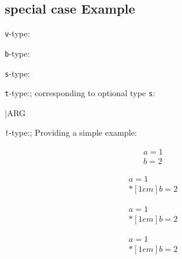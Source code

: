 \documentclass{article}
\begin{document}
\def\TypeT#1{\textbullet\; \texttt{#1}-type:}
\subsection{special case Example}
\TypeT{v}

\TypeT{b}

\TypeT{s}
\begin{code}
\NewDocumentCommand{}
{
}

\par
{}
\end{code}

\TypeT{t}; corresponding to optional type \texttt{s}:
\begin{code}
\NewDocumentCommand{}
{
}

\par
\foo|{ARG}
\end{code}

\TypeT{!}; Providing a simple example:
\begin{code}

\begin{align}
  a = 1 \\[1em]
  b = 2
\end{align}

\begin{align}
  a = 1 \\*[1em]
  b = 2
\end{align}

\begin{align}
  a = 1 \\* [1em]
  b = 2
\end{align}

\begin{align}
  a = 1 \\ *[1em]
  b = 2
\end{align}
\end{code}
\end{document}
